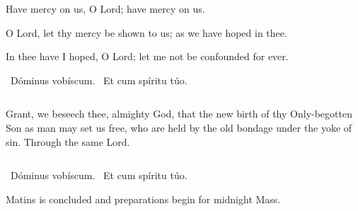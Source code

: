 {{{Have mercy on us, O Lord; have mercy on us.

O Lord, let thy mercy be shown to us; as we have hoped in thee.

In thee have I hoped, O Lord; let me not be confounded for ever.}
    \medskip
  }

  \Vbar{}~Dóminus vobíscum. \Rbar{}~Et cum spíritu túo.
  \bigskip

  {


  }
  \smallskip

  {
    \begin{columns}
           {Grant, we beseech thee, almighty God, that the new birth of thy Only-begotten Son as man may set us free, who are held by the old bondage under the yoke of sin. Through the same Lord.}
    \end{columns}
  }
  \bigskip{}

  \Vbar{}~Dóminus vobíscum. \Rbar{}~Et cum spíritu túo.

  \bigskip{}
  {
    \def\annot{\small{5.}}
    \large
    \def\breakbeforeresp{T}
    \greblockcustos

    \bigskip{}

    \noindent{}Matins is concluded and preparations begin for midnight Mass.
  }
}